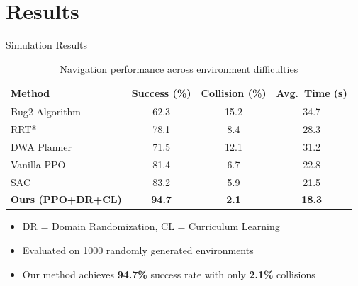 \documentclass[aspectratio=169]{beamer}
\begin{document}
\section{Results}

\begin{frame}{Simulation Results}
  \begin{table}
    \centering
    \caption{Navigation performance across environment difficulties}
    \begin{tabular}{@{}lccc@{}}
      \toprule
      \textbf{Method} & \textbf{Success (\%)} & \textbf{Collision (\%)} & \textbf{Avg.\ Time (s)} \\
      \midrule
      Bug2 Algorithm       & 62.3 & 15.2 & 34.7 \\
      RRT*                 & 78.1 & 8.4  & 28.3 \\
      DWA Planner          & 71.5 & 12.1 & 31.2 \\
      Vanilla PPO          & 81.4 & 6.7  & 22.8 \\
      SAC                  & 83.2 & 5.9  & 21.5 \\
      \midrule
      \textbf{Ours (PPO+DR+CL)} & \textbf{94.7} & \textbf{2.1} & \textbf{18.3} \\
      \bottomrule
    \end{tabular}
  \end{table}

  \begin{itemize}
    \item DR = Domain Randomization, CL = Curriculum Learning
    \item Evaluated on 1000 randomly generated environments
    \item Our method achieves \textbf{94.7\%} success rate with only \textbf{2.1\%} collisions
  \end{itemize}
\end{frame}
\end{document}
